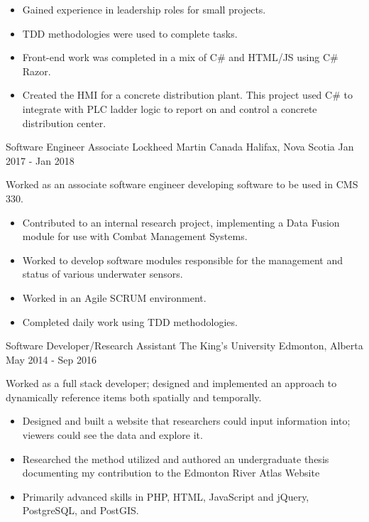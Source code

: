 \begin{cventries}
{\begin{itemize}
                \item Gained experience in leadership roles for small projects.
                \item TDD methodologies were used to complete tasks.
                \item Front-end work was completed in a mix of C\# and HTML/JS using C\# Razor.
                \item Created the HMI for a concrete distribution plant.  This project used C\# to integrate with PLC ladder logic to report on and control a concrete distribution center.
            \end{itemize}
        }
    \cventry
        {Software Engineer Associate}
        {Lockheed Martin Canada}
        {Halifax, Nova Scotia}
        {Jan 2017 - Jan 2018}
        {
            Worked as an associate software engineer developing software to be used in CMS 330.
            \begin{itemize}
                \item Contributed to an internal research project, implementing a Data Fusion module for use with Combat Management Systems.
                \item Worked to develop software modules responsible for the management and status of various underwater sensors.
                \item Worked in an Agile SCRUM environment.
                \item Completed daily work using TDD methodologies.
            \end{itemize}
        }
    \cventry
        {Software Developer/Research Assistant}
        {The King's University}
        {Edmonton, Alberta}
        {May 2014 - Sep 2016}
        {
            Worked as a full stack developer; designed and implemented an approach to dynamically reference items both spatially and temporally.
            \begin{itemize}
                \item Designed and built a website that researchers could input information into; viewers could see the data and explore it.
                \item Researched the method utilized and authored an undergraduate thesis documenting my contribution to the Edmonton River Atlas
                Website
                \item Primarily advanced skills in PHP, HTML, JavaScript and jQuery, PostgreSQL, and PostGIS.
            \end{itemize}
        }

\end{cventries}